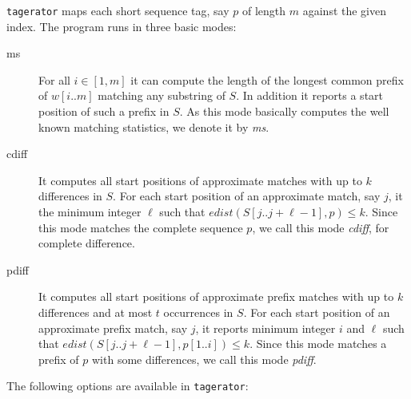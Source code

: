 \documentclass[12pt]{article}
\newcommand{\Substring}[3]{#1[#2..#3]}
\newcommand{\Program}[0]{\texttt{tagerator}\xspace}
\begin{document}
\Program maps each short sequence tag, say \(p\) of length \(m\)
against the given index. The program runs in three basic modes:
\begin{description}
\item[ms]
For all \(i\in[1,m]\) it can compute the length of the longest common prefix 
of \(\Substring{w}{i}{m}\) matching any substring of \(S\).
In addition it reports a start position of such a prefix in \(S\).
As this mode basically computes the well known matching statistics, we denote 
it by \textit{ms}.
\item[cdiff]
It computes all start positions of approximate matches with up to \(k\)
differences in \(S\). For each start position of an approximate match,
say \(j\), it the minimum integer \(\ell\) such that
\(edist(\Substring{S}{j}{j+\ell-1},p)\leq k\). Since this mode matches
the complete sequence \(p\), we call this mode \textit{cdiff},
for complete difference.
\item[pdiff]
It computes all start positions of approximate prefix matches with up to \(k\)
differences and at most \(t\) occurrences in \(S\). For each start position 
of an approximate prefix match, say \(j\), it reports minimum integer \(i\) and
\(\ell\) such that 
\(edist(\Substring{S}{j}{j+\ell-1},\Substring{p}{1}{i})\leq k\). Since this 
mode matches a prefix of \(p\) with some differences, we call this mode 
\textit{pdiff}.
\end{description}

The following options are available in \Program:
\end{document}
